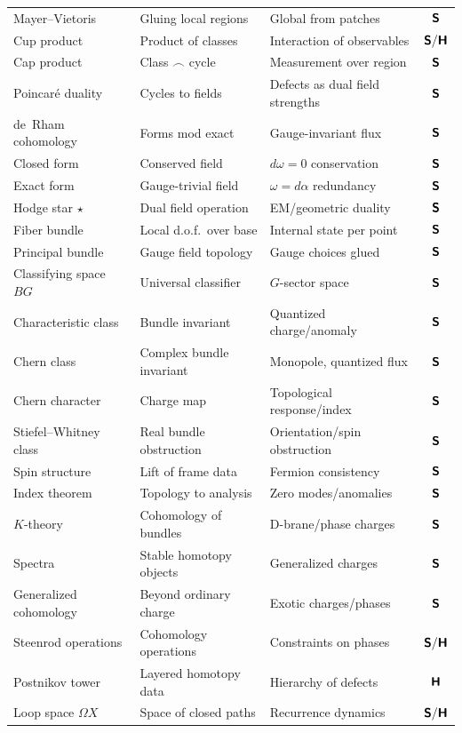 \documentclass[12pt]{article}
\theoremstyle{definition}
\theoremstyle{remark}
\newcommand{\Sfont}{\textnormal{\sffamily\bfseries S}}
\newcommand{\Hfont}{\textnormal{\sffamily\bfseries H}}
\begin{document}
{\begin{longtable}{%
  >{\raggedright\arraybackslash}p{4.2cm}%
  >{\raggedright\arraybackslash}p{4.8cm}%
  >{\raggedright\arraybackslash}p{3.4cm}%
  c}
Mayer--Vietoris & Gluing local regions & Global from patches & $\Sfont$\\
Cup product & Product of classes & Interaction of observables & $\Sfont/\Hfont$\\
Cap product & Class $\frown$ cycle & Measurement over region & $\Sfont$\\
Poincar\'e duality & Cycles to fields & Defects as dual field strengths & $\Sfont$\\
de~Rham cohomology & Forms mod exact & Gauge-invariant flux & $\Sfont$\\
Closed form & Conserved field & $d\omega=0$ conservation & $\Sfont$\\
Exact form & Gauge-trivial field & $\omega=d\alpha$ redundancy & $\Sfont$\\
Hodge star $\star$ & Dual field operation & EM/geometric duality & $\Sfont$\\
Fiber bundle & Local d.o.f.\ over base & Internal state per point & $\Sfont$\\
Principal bundle & Gauge field topology & Gauge choices glued & $\Sfont$\\
Classifying space $BG$ & Universal classifier & $G$-sector space & $\Sfont$\\
Characteristic class & Bundle invariant & Quantized charge/anomaly & $\Sfont$\\
Chern class & Complex bundle invariant & Monopole, quantized flux & $\Sfont$\\
Chern character & Charge map & Topological response/index & $\Sfont$\\
Stiefel--Whitney class & Real bundle obstruction & Orientation/spin obstruction & $\Sfont$\\
Spin structure & Lift of frame data & Fermion consistency & $\Sfont$\\
Index theorem & Topology to analysis & Zero modes/anomalies & $\Sfont$\\
$K$-theory & Cohomology of bundles & D-brane/phase charges & $\Sfont$\\
Spectra & Stable homotopy objects & Generalized charges & $\Sfont$\\
Generalized cohomology & Beyond ordinary charge & Exotic charges/phases & $\Sfont$\\
Steenrod operations & Cohomology operations & Constraints on phases & $\Sfont/\Hfont$\\
Postnikov tower & Layered homotopy data & Hierarchy of defects & $\Hfont$\\
Loop space $\Omega X$ & Space of closed paths & Recurrence dynamics & $\Sfont/\Hfont$\\

\end{longtable}}
\end{document}
